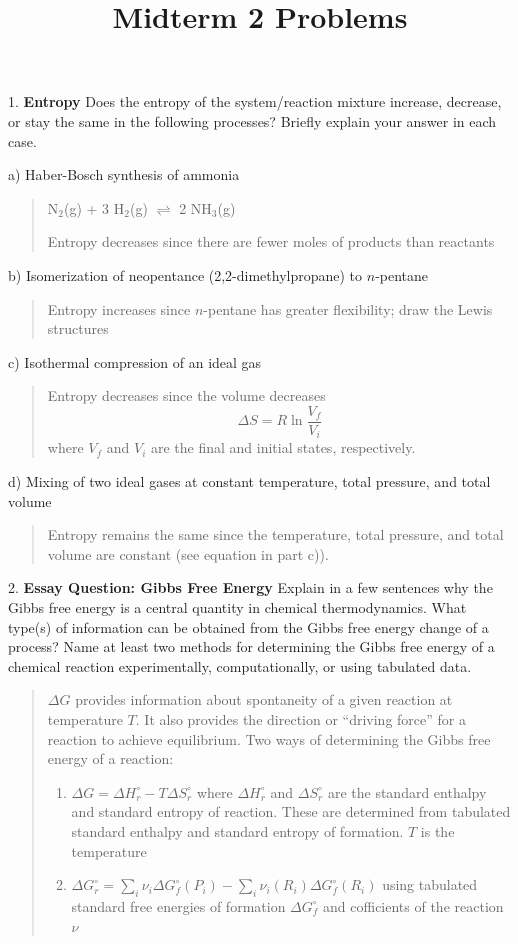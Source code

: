 \documentclass[11pt]{article}
\title{\textbf{Midterm 2 Problems}}
\newcommand{\brian}[1]{
  {\begin{quote}
      \color{blue} #1
  \end{quote}}
}
\begin{document}
\maketitle

1. \textbf{Entropy} Does the entropy of the system/reaction mixture increase,
decrease, or stay the same in the following processes? Briefly explain your
answer in each case.

a) Haber-Bosch synthesis of ammonia

\brian{N$_2$(g) + 3 H$_2$(g) $\rightleftharpoons$ 2 NH$_3$(g)

  Entropy decreases since there are fewer moles of products than reactants
}

b) Isomerization of neopentance (2,2-dimethylpropane) to $n$-pentane

\brian{Entropy increases since $n$-pentane has greater flexibility; draw the
  Lewis structures
}

c) Isothermal compression of an ideal gas

\brian{Entropy decreases since the volume decreases
  \begin{equation*}
    \Delta S = R\ln\frac{V_f}{V_i}
  \end{equation*}
  where $V_f$ and $V_i$ are the final and initial states, respectively.
}

d) Mixing of two ideal gases at constant temperature, total pressure, and total volume

\brian{Entropy remains the same since the temperature, total pressure, and total volume
  are constant (see equation in part c)).}

2. \textbf{Essay Question: Gibbs Free Energy} Explain in a few sentences why the Gibbs
free energy is a central quantity in chemical thermodynamics. What type(s) of information
can be obtained from the Gibbs free energy change of a process? Name at least two methods
for determining the Gibbs free energy of a chemical reaction experimentally, computationally,
or using tabulated data.

\brian{$\Delta G$ provides information about spontaneity of a given reaction at temperature
  $T$. It also provides the direction or ``driving force'' for a reaction to achieve
  equilibrium. Two ways of determining the Gibbs free energy of a reaction:
  \begin{enumerate}
  \item $\Delta G = \Delta H^\circ_r - T\Delta S^\circ_r$ where $\Delta H^\circ_r$ and $\Delta S^\circ_r$
    are the standard enthalpy and standard entropy of reaction. These are determined from tabulated
    standard enthalpy and standard entropy of formation. $T$ is the temperature
  \item $\Delta G^\circ_r = \sum_i \nu_i\Delta G^\circ_f(P_i)-\sum_i\nu_i(R_i)\Delta G^\circ_f(R_i)$
    using tabulated standard free energies of formation $\Delta G^\circ_f$ and cofficients of the reaction
    $\nu$
  \end{enumerate}
}
\end{document}
